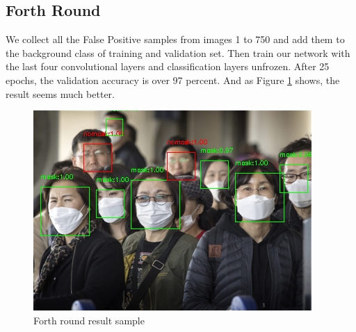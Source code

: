\documentclass[10pt,a4paper]{report}
\begin{document}
\subsection{Forth Round}
We collect all the False Positive samples from images 1 to 750 and add them to the background class of training and validation set. Then train our network with the last four convolutional layers and classification layers unfrozen. After 25 epochs, the validation accuracy is over 97 percent. And as Figure \ref{fig:f4} shows, the result seems much better.
 \begin{figure}[hbtp]

\centering
\includegraphics[scale=0.8]{imgs/r4.png}
\caption{Forth round result sample}
        \label{fig:f4}
\end{figure}
\end{document}
